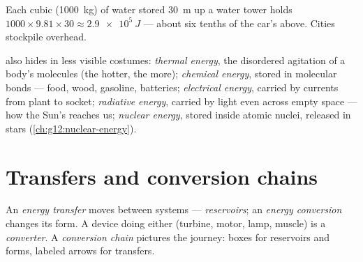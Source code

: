 \begin{example}\label{ex:g10:energy-conservation:potential}
Each cubic  (\qty{1000}{kg}) of water stored \qty{30}{m} up a
water tower holds $1000 \times 9.81 \times 30 \approx \qty{2.9e5}{J}$
--- about six tenths of the car's  above. Cities
stockpile  overhead.
\end{example}

\begin{definition}\label{def:g10:energy-conservation:forms}
 also hides in less visible costumes: \emph{thermal
energy}, the disordered agitation of a body's
molecules (the hotter, the more); \emph{chemical
energy}, stored in molecular bonds --- food,
wood, gasoline, batteries; \emph{electrical
energy}, carried by currents from plant to
socket; \emph{radiative energy}, carried by
light even across empty space --- how the Sun's  reaches us;
\emph{nuclear energy}, stored inside atomic
nuclei, released in stars (\cref{ch:g12:nuclear-energy}).
\end{definition}

\section{Transfers and conversion chains}

\begin{definition}\label{def:g10:energy-conservation:transfer}
An \emph{energy transfer} moves 
between systems --- \emph{reservoirs};
an \emph{energy conversion} changes its
form. A device doing either (turbine, motor, lamp, muscle) is a
\emph{converter}. A \emph{conversion
chain} pictures the journey: boxes for
reservoirs and forms, labeled arrows for transfers.
\end{definition}

